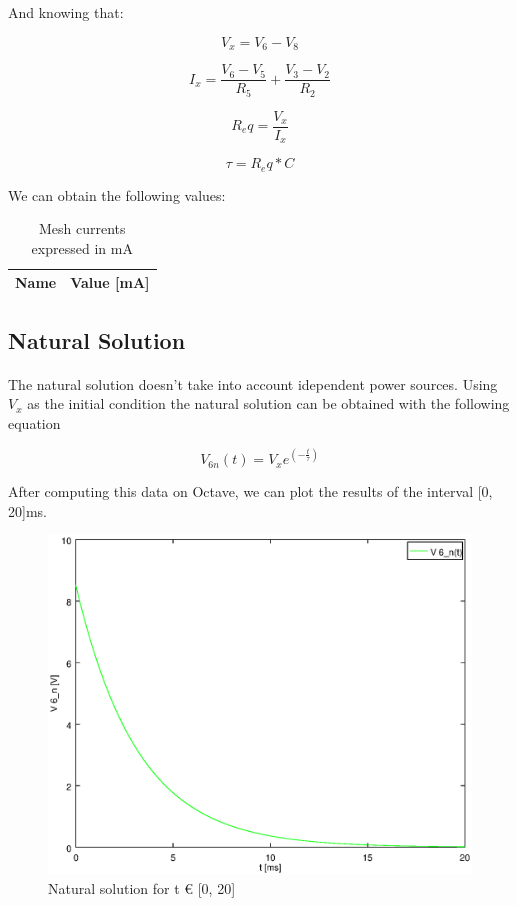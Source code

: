 And knowing that:

\begin{equation}
	V_x = V_6 - V_8
\end{equation}

\begin{equation}
	I_x = \frac{V_6 - V_5}{R_5} + \frac{V_3 - V_2}{R_2}
\end{equation}

\begin{equation}
	R_eq = \frac{V_x}{I_x}
\end{equation}

\begin{equation}
	\tau = R_eq * C
\end{equation}

We can obtain the following values:

\begin{table}[hbt!]
\centering
\begin{tabular}{|l|r|}
\hline    
{\bf Name} & {\bf Value [mA]} \\ \hline

\end{tabular}
\caption{Mesh currents expressed in mA}
\label{tab:op}
\end{table}

\subsection{Natural Solution}

\paragraph{} The natural solution doesn't take into account idependent power sources. Using $V_x$ as the initial condition the natural solution can be obtained with the following equation

\begin{equation}
	V_{6n}(t) = V_x e^{(-\frac{t}{\tau})}
\end{equation}

After computing this data on Octave, we can plot the results of the interval [0, 20]ms.

\begin{figure}[!h]
	\centering
	\includegraphics[width=0.7\linewidth]{natural.eps}
	\caption{Natural solution for t € [0, 20]}
\end{figure}

